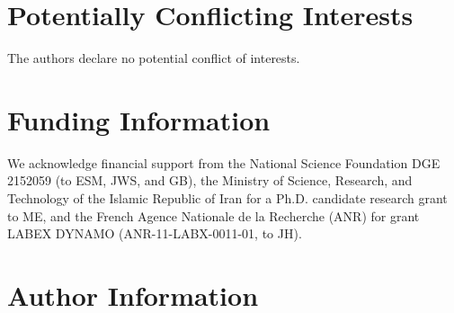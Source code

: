 \documentclass[9pt,tutorial]{Styling/livecoms}
\begin{document}
\section{Potentially Conflicting Interests}
The authors declare no potential conflict of interests.


\section{Funding Information}
We acknowledge financial support from the National Science Foundation DGE 2152059 (to ESM, JWS, and GB), the Ministry of Science, Research, and Technology of the Islamic Republic of Iran for a Ph.D. candidate research grant to ME, and the French Agence Nationale de la Recherche (ANR) for grant LABEX DYNAMO (ANR-11-LABX-0011-01, to JH).

\section*{Author Information}
\makeorcid

% 

\end{document}
